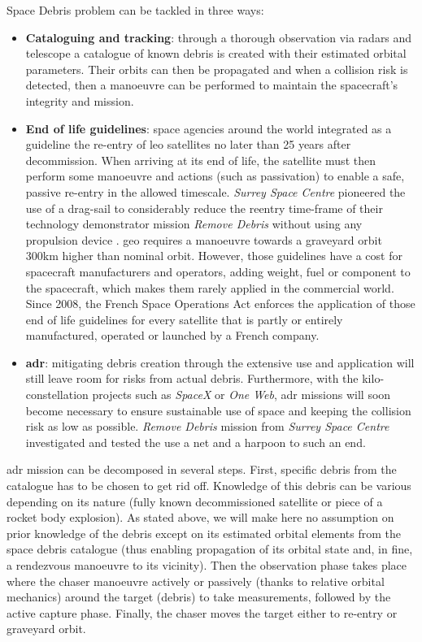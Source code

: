 Space Debris problem can be tackled in three ways:
\begin{itemize}
    \item \textbf{Cataloguing and tracking}: through a thorough observation via radars and telescope a catalogue of known debris is created with their estimated orbital parameters. Their orbits can then be propagated and when a collision risk is detected, then a manoeuvre can be performed to maintain the spacecraft's integrity and mission.
    \item \textbf{End of life guidelines}: space agencies around the world integrated as a guideline the re-entry of \gls{leo} satellites no later than 25 years after decommission. When arriving at its end of life, the satellite must then perform some manoeuvre and actions (such as passivation) to enable a safe, passive re-entry in the allowed timescale. \emph{Surrey Space Centre} pioneered the use of a drag-sail to considerably reduce the reentry time-frame of their technology demonstrator mission \emph{Remove Debris} without using any propulsion device \citep{forshaw_removedebris:_2016}. \gls{geo} requires a manoeuvre towards a graveyard orbit 300km higher than nominal orbit. However, those guidelines have a cost for spacecraft manufacturers and operators, adding weight, fuel or component to the spacecraft, which makes them rarely applied in the commercial world. Since 2008, the French Space Operations Act enforces the application of those end of life guidelines for every satellite that is partly or entirely manufactured, operated or launched by a French company.
    \item \textbf{\gls{adr}}: mitigating debris creation through the extensive use and application will still leave room for risks from actual debris. Furthermore, with the kilo-constellation projects such as \emph{SpaceX} or \emph{One Web}, \gls{adr} missions will soon become necessary to ensure sustainable use of space and keeping the collision risk as low as possible. \emph{Remove Debris} mission from \emph{Surrey Space Centre} investigated and tested the use a net and a harpoon to such an end.
\end{itemize}


\gls{adr} mission can be decomposed in several steps. First, specific debris from the catalogue has to be chosen to get rid off. Knowledge of this debris can be various depending on its nature (fully known decommissioned satellite or piece of a rocket body explosion). As stated above, we will make here no assumption on prior knowledge of the debris except on its estimated orbital elements from the space debris catalogue (thus enabling propagation of its orbital state and, in fine, a rendezvous manoeuvre to its vicinity). Then the observation phase takes place where the chaser manoeuvre actively or passively (thanks to relative orbital mechanics) around the target (debris) to take measurements, followed by the active capture phase. Finally, the chaser moves the target either to re-entry or graveyard orbit. 

